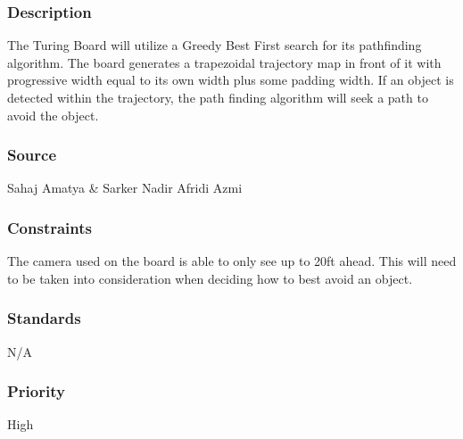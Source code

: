 \subsubsection{Description}
The Turing Board will utilize a Greedy Best First search for its pathfinding algorithm. The board generates a trapezoidal trajectory map in front of it with progressive width equal to its own width plus some padding width. If an object is detected within the trajectory, the path finding algorithm will seek a path to avoid the object.
\subsubsection{Source}
Sahaj Amatya \& Sarker Nadir Afridi Azmi
\subsubsection{Constraints}
The camera used on the board is able to only see up to 20ft ahead. This will need to be taken into consideration when deciding how to best avoid an object.
\subsubsection{Standards}
N/A
\subsubsection{Priority}
High
